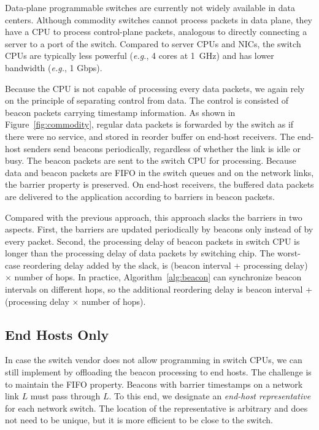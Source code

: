 Data-plane programmable switches are currently not widely available in data centers. Although commodity switches cannot process packets in data plane, they have a CPU to process control-plane packets, analogous to directly connecting a server to a port of the switch. Compared to server CPUs and NICs, the switch CPUs are typically less powerful (\textit{e.g.}, 4 cores at 1~GHz) and has lower bandwidth (\textit{e.g.}, 1 Gbps).

Because the CPU is not capable of processing every data packets, we again rely on the principle of separating control from data. The control is consisted of beacon packets carrying timestamp information. As shown in Figure~\ref{fig:commodity}, regular data packets is forwarded by the switch as if there were no \sys service, and stored in reorder buffer on end-host receivers. The end-host senders send beacons periodically, regardless of whether the link is idle or busy. The beacon packets are sent to the switch CPU for processing. Because data and beacon packets are FIFO in the switch queues and on the network links, the barrier property is preserved. On end-host receivers, the buffered data packets are delivered to the application according to barriers in beacon packets.

Compared with the previous approach, this approach slacks the barriers in two aspects. First, the barriers are updated periodically by beacons only instead of by every packet. Second, the processing delay of beacon packets in switch CPU is longer than the processing delay of data packets by switching chip.
The worst-case reordering delay added by the slack, is (beacon interval + processing delay) $\times$ number of hops.
In practice, Algorithm~\ref{alg:beacon} can synchronize beacon intervals on different hops, so the additional reordering delay is beacon interval + (processing delay $\times$ number of hops).

\subsection{End Hosts Only}
\label{sec:end-host}

In case the switch vendor does not allow programming in switch CPUs, we can still implement \sys by offloading the beacon processing to end hosts. The challenge is to maintain the FIFO property. Beacons with barrier timestamps on a network link $L$ must pass through $L$. To this end, we designate an \textit{end-host representative} for each network switch. The location of the representative is arbitrary and does not need to be unique, but it is more efficient to be close to the switch.

